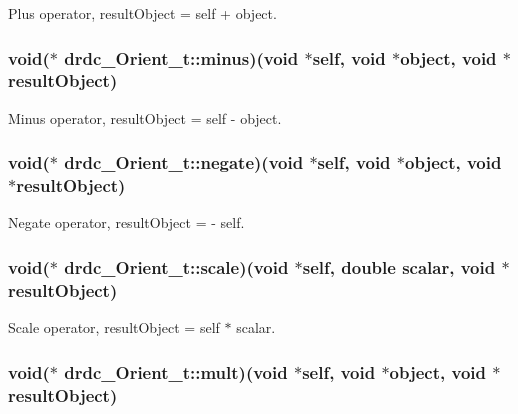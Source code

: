 Plus operator, resultObject = self + object. 

\hypertarget{structdrdc__Orient__t_8bc82fdd134eeaf579ab7ea98cbb8613}{
\subsubsection[minus]{\setlength{\rightskip}{0pt plus 5cm}void($\ast$ {\bf drdc\_\-Orient\_\-t::minus})(void $\ast$self, void $\ast$object, void $\ast$resultObject)}}
\label{structdrdc__Orient__t_8bc82fdd134eeaf579ab7ea98cbb8613}


Minus operator, resultObject = self - object. 

\hypertarget{structdrdc__Orient__t_6bf2cf45abcb88fa36e006091f9b9f7d}{
\subsubsection[negate]{\setlength{\rightskip}{0pt plus 5cm}void($\ast$ {\bf drdc\_\-Orient\_\-t::negate})(void $\ast$self, void $\ast$object, void $\ast$resultObject)}}
\label{structdrdc__Orient__t_6bf2cf45abcb88fa36e006091f9b9f7d}


Negate operator, resultObject = - self. 

\hypertarget{structdrdc__Orient__t_20bb85a9a44ee33c191386b0d8b03a38}{
\subsubsection[scale]{\setlength{\rightskip}{0pt plus 5cm}void($\ast$ {\bf drdc\_\-Orient\_\-t::scale})(void $\ast$self, double scalar, void $\ast$resultObject)}}
\label{structdrdc__Orient__t_20bb85a9a44ee33c191386b0d8b03a38}


Scale operator, resultObject = self $\ast$ scalar. 

\hypertarget{structdrdc__Orient__t_eca47781207092b889d7d7b8aaabff5a}{
\subsubsection[mult]{\setlength{\rightskip}{0pt plus 5cm}void($\ast$ {\bf drdc\_\-Orient\_\-t::mult})(void $\ast$self, void $\ast$object, void $\ast$resultObject)}}
\label{structdrdc__Orient__t_eca47781207092b889d7d7b8aaabff5a}


